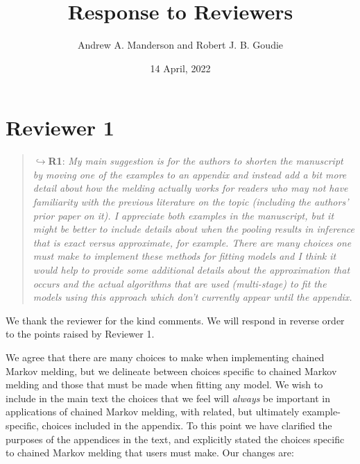 \documentclass[
  10pt,
  a4paper,
]{article}
\title{Response to Reviewers}
\author{Andrew A. Manderson and Robert J. B. Goudie}
\date{14 April, 2022}
\begin{document}
\maketitle

\hypertarget{reviewer-1}{%
\section*{Reviewer 1}\label{reviewer-1}}

\begin{quote}
\(\hookrightarrow\)\textbf{R1}: \emph{My main suggestion is for the
authors to shorten the manuscript by moving one of the examples to an
appendix and instead add a bit more detail about how the melding
actually works for readers who may not have familiarity with the
previous literature on the topic (including the authors' prior paper on
it). I appreciate both examples in the manuscript, but it might be
better to include details about when the pooling results in inference
that is exact versus approximate, for example. There are many choices
one must make to implement these methods for fitting models and I think
it would help to provide some additional details about the approximation
that occurs and the actual algorithms that are used (multi-stage) to fit
the models using this approach which don't currently appear until the
appendix.}
\end{quote}

We thank the reviewer for the kind comments. We will respond in reverse
order to the points raised by Reviewer 1.

We agree that there are many choices to make when implementing chained
Markov melding, but we delineate between choices specific to chained
Markov melding and those that must be made when fitting any model. We
wish to include in the main text the choices that we feel will
\emph{always} be important in applications of chained Markov melding,
with related, but ultimately example-specific, choices included in the
appendix. To this point we have clarified the purposes of the appendices
in the text, and explicitly stated the choices specific to chained
Markov melding that users must make. Our changes are:
\end{document}
